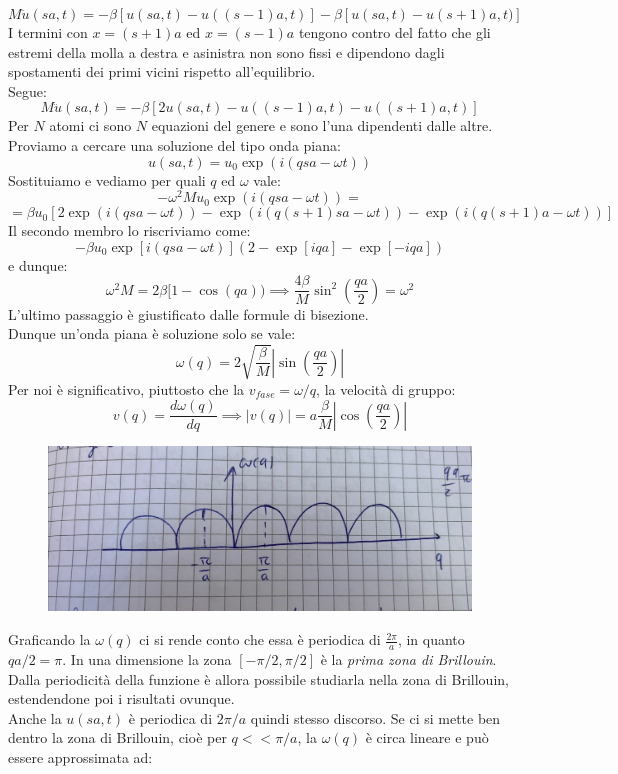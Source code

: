 \documentclass{book}
\begin{document}
        $$M \ddot{u} (sa, t) = -\beta [u(sa,t)-u((s-1)a,t)]-\beta [u(sa,t)-u(s+1)a,t)]$$
        I termini con $x=(s+1)a$ ed $x=(s-1)a$ tengono contro del fatto che gli estremi della molla a destra e asinistra non sono fissi e dipendono dagli spostamenti dei primi vicini rispetto all'equilibrio.\\
        Segue:
        $$M\ddot{u}(sa,t) = - \beta [2u(sa,t) -u((s-1)a,t)-u((s+1)a,t)]$$
        Per $N$ atomi ci sono $N$ equazioni del genere e sono l'una dipendenti dalle altre.\\
        Proviamo a cercare una soluzione del tipo onda piana:
        $$u(sa,t) = u_{0}\exp{(i(qsa-\omega t))}$$
        Sostituiamo e vediamo per quali $q$ ed $\omega$ vale:
        $$-\omega ^{2} M u_{0} \exp{(i(qsa-\omega t))}=$$
        $$ =\beta u_{0}[2\exp{(i(qsa-\omega t))}-\exp{(i(q(s+1)sa-\omega t))}-\exp{(i(q(s+1)a-\omega t))}]$$
        Il secondo membro lo riscriviamo come:
        $$- \beta u_{0}\exp[{i(qsa-\omega t)}] (2-\exp{[iqa]}-\exp{[-iqa]})$$
        e dunque:
        $$\omega^{2}M = 2\beta [1-\cos (qa)) \implies \frac{4\beta}{M}\sin^{2}(\frac{qa}{2})= \omega ^{2}$$
        L'ultimo passaggio è giustificato dalle formule di bisezione.\\
        Dunque un'onda piana è soluzione solo se vale:
        $$\omega(q) = 2 \sqrt{\frac{\beta}{M}}|\sin{(\frac{qa}{2})}|$$
        Per noi è significativo, piuttosto che la $v_{fase} = \omega/q$, la velocità di gruppo:
        $$v(q) = \frac{d \omega(q)}{dq} \implies |v(q)|=a \frac{\beta}{M}|\cos{(\frac{qa}{2})}|$$
        \begin{figure}[h!]
            \centering
            \includegraphics[width=0.5\linewidth]{img/imnothere3.png}
        \end{figure}
        Graficando la $\omega(q)$ ci si rende conto che essa è periodica di $\displaystyle\frac{2\pi}{a}$, in quanto $qa/2 = \pi$. In una dimensione la zona $[-\pi/2, \pi/2]$ è la \textit{prima zona di Brillouin}. Dalla periodicità della funzione è allora possibile studiarla nella zona di Brillouin, estendendone poi i risultati ovunque.\\
        Anche la $u(sa,t)$ è periodica di $2\pi/a$ quindi stesso discorso. Se ci si mette ben dentro la zona di Brillouin, cioè per $q << \pi/a$, la $\omega(q)$ è circa lineare e può essere approssimata ad:
\end{document}
